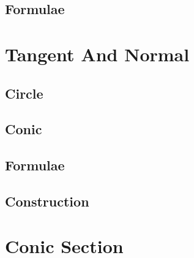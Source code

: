 \documentclass[journal]{IEEEtran}
\begin{document}
\subsection{Formulae}

\newpage
\section{Tangent And Normal}
\subsection{Circle}

\subsection{Conic}

\subsection{Formulae}

\subsection{Construction}

%
\appendices
\section{Conic Section}

\end{document}
